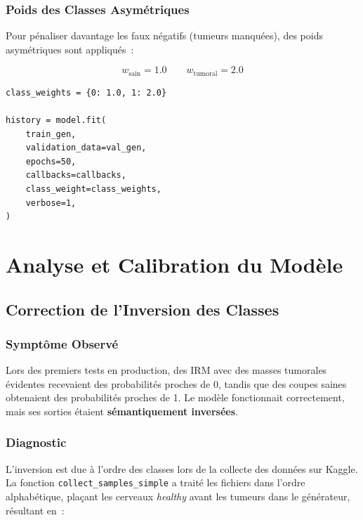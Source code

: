 \documentclass[12pt, a4paper]{report}
\newcommand{\code}[1]{\texttt{\small #1}}
\begin{document}
\subsection{Poids des Classes Asymétriques}

Pour pénaliser davantage les faux négatifs (tumeurs manquées), des
poids asymétriques sont appliqués~:

\begin{equation}
  w_{\text{sain}} = 1.0 \qquad w_{\text{tumoral}} = 2.0
\end{equation}

\begin{lstlisting}[caption={Poids des classes dans model.fit()},
                   label={lst:classweights}]
class_weights = {0: 1.0, 1: 2.0}

history = model.fit(
    train_gen,
    validation_data=val_gen,
    epochs=50,
    callbacks=callbacks,
    class_weight=class_weights,
    verbose=1,
)
\end{lstlisting}

\chapter{Analyse et Calibration du Modèle}
\label{chap:calibration}

\section{Correction de l'Inversion des Classes}
\label{sec:inversion}

\subsection{Symptôme Observé}

Lors des premiers tests en production, des IRM avec des masses tumorales
évidentes recevaient des probabilités proches de 0, tandis que des
coupes saines obtenaient des probabilités proches de 1. Le modèle
fonctionnait correctement, mais ses sorties étaient \textbf{sémantiquement
inversées}.

\subsection{Diagnostic}

L'inversion est due à l'ordre des classes lors de la collecte des
données sur Kaggle. La fonction \code{collect\_samples\_simple} a
traité les fichiers dans l'ordre alphabétique, plaçant les cerveaux
\textit{healthy} avant les tumeurs dans le générateur, résultant en~:
\end{document}
